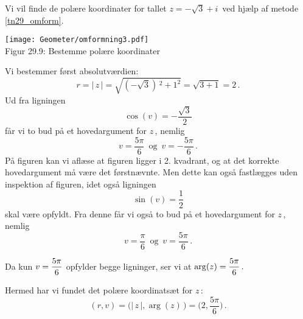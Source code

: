 \begin{example}\label{tn29_exOmform}
Vi vil finde de polære koordinater for tallet $z=-\sqrt 3+i\,$ ved hjælp af metode \ref{tn29_omform}.
\begin{center}
	\texttt{[image: Geometer/omformning3.pdf]}\\
Figur 29.9: Bestemme polære koordinater 
\end{center}

Vi bestemmer først absolutværdien:
$$
r=|\,z\,|=\sqrt{(-\sqrt 3)\,^2+1^2}=\sqrt{3+1}=2\,.
$$
Ud fra ligningen
$$\cos(v)=-\frac{\sqrt 3}2$$
får vi to bud på et hovedargument for $z\,$, nemlig
$$v=\frac{5\pi}6\,\,\,\mathrm{og}\,\,\,v=-\frac{5\pi}6\,.$$
På figuren kan vi aflæse at figuren ligger i 2. kvadrant, og at det korrekte hovedargument må være det førstnævnte. Men dette kan også fastlægges uden inspektion af figuren, idet også ligningen
$$\sin(v)=\frac12$$
skal være opfyldt. Fra denne får vi også to bud på et hovedargument for $z\,$, nemlig
$$v=\frac{\pi}6\,\,\,\mathrm{og}\,\,\,v=\frac{5\pi}6\,.$$

Da kun $\begin{displaystyle}v=\frac{5\pi}6\end{displaystyle} $ opfylder begge ligninger, ser vi at $\begin{displaystyle} \arg(z)=\frac{5\pi}6\,.\end{displaystyle} $\bs

Hermed har vi fundet det polære koordinatsæt for $z\,$:
$$(r,v)=\big(|\,z\,|,\arg(z)\,\big)=\big(2,\frac{5\pi}6\big)\,.$$
\end{example}



